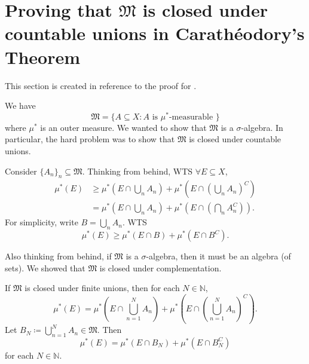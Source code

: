 \documentclass[notoc,notitlepage]{tufte-book}
\begin{document}
\section{Proving that \texorpdfstring{$\mathfrak{M}$}{M} is closed under countable unions in Carath\'{e}odory's Theorem}\label{sec:proving_that_m_is_closed_under_countable_unions_in_caratheodory_s_theorem}

This section is created in reference to
the proof for .

We have
\begin{equation*}
  \mathfrak{M} = \{ A \subseteq X : A \text{ is } \mu^*\text{-measurable } \}
\end{equation*}
where $\mu^*$ is an outer measure.
We wanted to show that $\mathfrak{M}$ is a $\sigma$-algebra.
In particular, the hard problem was to show that
$\mathfrak{M}$ is closed under countable unions.

Consider $\{ A_n \}_{n} \subseteq \mathfrak{M}$.
Thinking from behind, WTS $\forall E \subseteq X$,
\begin{align*}
  \mu^*(E)
  &\geq \mu^* \left( E \cap \bigcup_{n} A_n \right)
    + \mu^* \left( E \cap \left( \bigcup_{n} A_n \right)^C \right) \\
  &= \mu^* \left( E \cap \bigcup_{n} A_n \right)
    + \mu^* \left( E \cap \left( \bigcap_{n} A_n^C \right) \right).
\end{align*}
For simplicity, write $B = \bigcup_{n} A_n$.
WTS
\begin{equation}\tag{$*$}\label{eq:appendix_1_eq_1}
  \mu^*(E) \geq \mu^*(E \cap B) + \mu^*(E \cap B^C).
\end{equation}

Also thinking from behind,
if $\mathfrak{M}$ is a $\sigma$-algebra, 
then it must be an algebra (of sets).
We showed that $\mathfrak{M}$ is closed under complementation.

If $\mathfrak{M}$ is closed under finite unions,
then for each $N \in \mathbb{N}$,
\begin{equation*}
  \mu^*(E) = \mu^* \left( E \cap \bigcup_{n=1}^{N} A_n \right)
    + \mu^* \left( E \cap \left( \bigcup_{n=1}^{N} A_n \right)^C \right).
\end{equation*}
Let $B_N \coloneqq \bigcup_{n=1}^{N} A_n \in \mathfrak{M}$. Then
\begin{equation}\tag{$\dagger$}\label{eq:appendix_1_eq_2}
  \mu^*(E) = \mu^* (E \cap B_N) + \mu^* (E \cap B_N^C)
\end{equation}
for each $N \in \mathbb{N}$.
\end{document}

